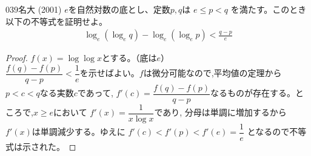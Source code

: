 \begin{prob}{039}{}{名大 (2001)}
 $e$を自然対数の底とし、定数$p,q$は $e\le p<q$ を満たす。このとき以下の不等式を証明せよ。
 \begin{align*}
  \log_e\left(\log_e q\right) - \log_e\left(\log_e p\right) < \frac{q-p}{e}
 \end{align*}
\end{prob}

\begin{proof}
$f(x)=\log{\log{x}}$とする。（底は$e$）\\
$\dfrac{f(q)-f(p)}{q-p}<\dfrac{1}{e}$を示せばよい。$f$は微分可能なので,平均値の定理から$p<c<q$なる実数$c$であって, $f'(c)=\dfrac{f(q)-f(p)}{q-p}$なるものが存在する。ところで,$x\geq e$において $f'(x)=\dfrac{1}{x\log{x}}$であり, 分母は単調に増加するから$f'(x)$は単調減少する。ゆえに $f'(c)<f'(p)<f'(e)=\dfrac{1}{e}$ となるので不等式は示された。
\end{proof}
